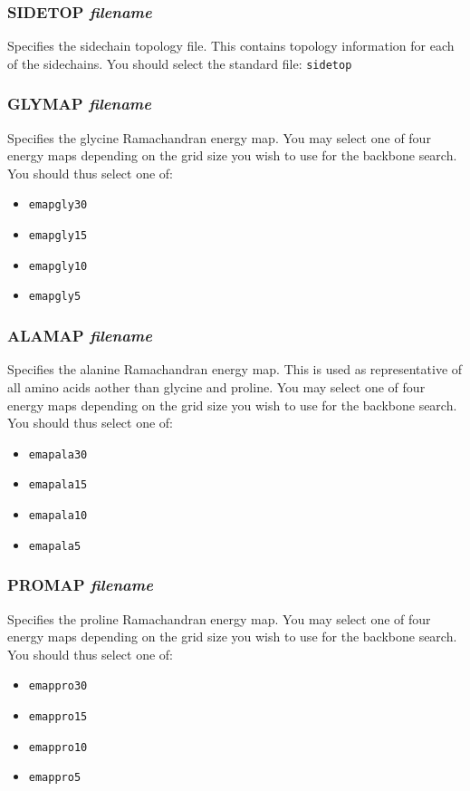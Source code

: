 \subsubsection{SIDETOP {\em filename}}
\es
Specifies the sidechain topology file. This contains topology information
for each of the sidechains. You should select the standard file:
{\tt sidetop}

\subsubsection{GLYMAP {\em filename}}
\es
Specifies the glycine Ramachandran energy map. You may select one of four
energy maps depending on the grid size you wish to use for the backbone
search. You should thus select one of:
\begin{itemize}
\item {\tt emapgly30}
\item {\tt emapgly15}
\item {\tt emapgly10}
\item {\tt emapgly5}
\end{itemize}

\subsubsection{ALAMAP {\em filename}}
\es
Specifies the alanine Ramachandran energy map. This is used as representative
of all amino acids aother than glycine and proline. You may select one of four
energy maps depending on the grid size you wish to use for the backbone
search. You should thus select one of:
\begin{itemize}
\item {\tt emapala30}
\item {\tt emapala15}
\item {\tt emapala10}
\item {\tt emapala5}
\end{itemize}

\subsubsection{PROMAP {\em filename}}
\es
Specifies the proline Ramachandran energy map. You may select one of four
energy maps depending on the grid size you wish to use for the backbone
search. You should thus select one of:
\begin{itemize}
\item {\tt emappro30}
\item {\tt emappro15}
\item {\tt emappro10}
\item {\tt emappro5}
\end{itemize}

